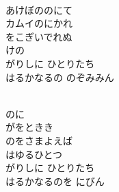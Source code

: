\documentclass[10pt,b5j]{tarticle} %
\begin{document}
\vspace{1.5em} %
\newcommand{\linespace}{0.5em} %
\newcommand{\blocksize}{0.5\hsize} %
\newcommand{\itemmargin}{3em} %
\begin{enumerate} %
    \setlength{\itemindent}{\itemmargin} %
    \begin{minipage}[c]{\blocksize}
    
        \vspace{\linespace}
        \item~\\
        あけぼののにて\\
        カムイのにかれ\\
        をこぎいでれぬ\\
        けの\\
        がりしに ひとりたち\\
        はるかなるの のぞみみん
        
    \end{minipage}
    \begin{minipage}[c]{\blocksize}
        
        \vspace{\linespace}
        \item~\\
        のに\\
        がをときき\\
        のをさまよえば\\
        はゆるひとつ\\
        がりしに ひとりたち\\
        はるかなるのを にびん
        
    \end{minipage}
    \begin{minipage}[c]{\blocksize}
        

\end{minipage}
\end{enumerate}
\end{document}
